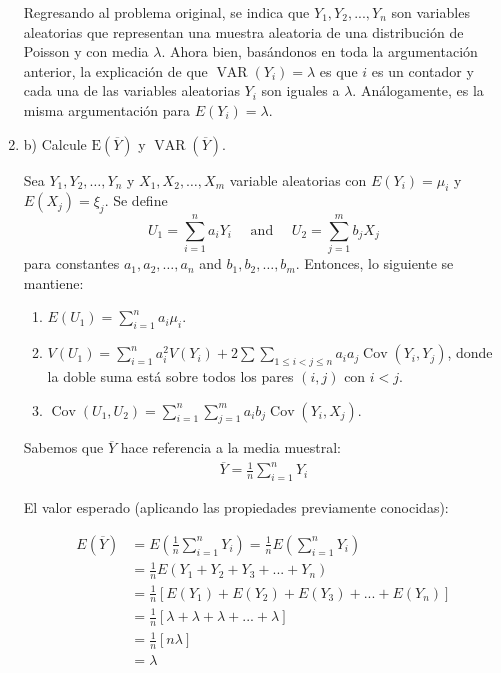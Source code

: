 \begin{enumerate}
\begin{solution}
   Regresando al problema original, se indica que $Y_1,Y_2,...,Y_n$ son variables aleatorias que representan una muestra aleatoria de una distribución de Poisson y con media $\lambda$. Ahora bien, basándonos en toda la argumentación anterior, la explicación de que  $\operatorname{VAR}(Y_i)=\lambda$ es que $i$ es un contador y cada una de las variables aleatorias $Y_i$ son iguales a $\lambda$. Análogamente, es la misma argumentación para $E(Y_i)=\lambda$.

    \end{solution}
\item  b) Calcule $\mathrm{E}(\overline{Y})$ y $\operatorname{VAR}(\overline{Y})$.

\begin{tcolorbox}[colback=gray!15,colframe=black!1!black,title=Teorema 5.12]
Sea $Y_{1}, Y_{2}, \ldots, Y_{n}$ y $X_{1}, X_{2}, \ldots, X_{m}$ variable aleatorias con $E\left(Y_{i}\right)=\mu_{i}$ y $E\left(X_{j}\right)=\xi_{j}$. Se define
$$
U_{1}=\sum_{i=1}^{n} a_{i} Y_{i} \quad \text { and } \quad U_{2}=\sum_{j=1}^{m} b_{j} X_{j}
$$
para constantes $a_{1}, a_{2}, \ldots, a_{n}$ and $b_{1}, b_{2}, \ldots, b_{m} .$ Entonces, lo siguiente se mantiene: 
\begin{enumerate}
    \item $E\left(U_{1}\right)=\sum_{i=1}^{n} a_{i} \mu_{i} .$
    \item  $V\left(U_{1}\right)=\sum_{i=1}^{n} a_{i}^{2} V\left(Y_{i}\right)+2 \sum \sum_{1 \leq i<j \leq n} a_{i} a_{j} \operatorname{Cov}\left(Y_{i}, Y_{j}\right)$, donde
la doble suma está sobre todos los pares $(i, j)$ con $i<j$.
    \item $
\operatorname{Cov}\left(U_{1}, U_{2}\right)=\sum_{i=1}^{n} \sum_{j=1}^{m} a_{i} b_{j} \operatorname{Cov}\left(Y_{i}, X_{j}\right) .
$
\end{enumerate}


\end{tcolorbox}
\begin{solution}
    Sabemos que $\overline{Y}$ hace referencia a la media muestral: 
    \begin{gather*}
        \overline{Y}= \frac{1}{n}\sum_{i=1}^{n}Y_i
    \end{gather*}
    
    \linea 
    
    El valor esperado (aplicando las propiedades previamente conocidas): 
    
    \begin{align*}
        E(\overline{Y}) &= E\left(\frac{1}{n}\sum_{i=1}^{n}Y_i\right)  = \frac{1}{n}E\left(\sum_{i=1}^{n}Y_i\right)\\
        &= \frac{1}{n}E\left(Y_1+Y_2+Y_3+...+Y_n\right)\\
        &=\frac{1}{n}\left[E(Y_1)+E(Y_2)+E(Y_3)+...+E(Y_n)\right]\\
        &= \frac{1}{n}\left[\lambda+\lambda+\lambda+...+\lambda\right]\\
        &= \frac{1}{n}\left[n\lambda\right]\\
        &= \lambda
    \end{align*}
    

\end{solution}
\end{enumerate}
